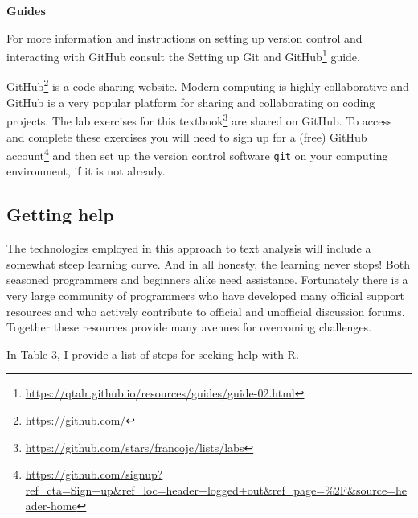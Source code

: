 \documentclass[
  letterpaper,
]{latex/krantz}
\theoremstyle{definition}
\theoremstyle{remark}
\DeclareRobustCommand{\href}[2]{#2\footnote{\url{#1}}}
\begin{document}
\begin{tcolorbox}[enhanced jigsaw, colframe=quarto-callout-color-frame, breakable, bottomrule=.15mm, arc=.35mm, left=2mm, opacityback=0, rightrule=.15mm, colback=white, toprule=.15mm, leftrule=.75mm]

\textbf{ Guides}

For more information and instructions on setting up version control and
interacting with GitHub consult the
\href{https://qtalr.github.io/resources/guides/guide-02.html}{Setting up
Git and GitHub} guide.

\end{tcolorbox}

\href{https://github.com/}{GitHub} is a code sharing website. Modern
computing is highly collaborative and GitHub is a very popular platform
for sharing and collaborating on coding projects. The
\href{https://github.com/stars/francojc/lists/labs}{lab exercises for
this textbook} are shared on GitHub. To access and complete these
exercises you will need to
\href{https://github.com/signup?ref_cta=Sign+up&ref_loc=header+logged+out&ref_page=\%2F&source=header-home}{sign
up for a (free) GitHub account} and then set up the version control
software \texttt{git} on your computing environment, if it is not
already.

\subsection*{Getting help}\label{sec-p-getting-help}

The technologies employed in this approach to text analysis will include
a somewhat steep learning curve. And in all honesty, the learning never
stops! Both seasoned programmers and beginners alike need assistance.
Fortunately there is a very large community of programmers who have
developed many official support resources and who actively contribute to
official and unofficial discussion forums. Together these resources
provide many avenues for overcoming challenges.

In Table 3, I provide a list of steps for seeking help with R.
\end{document}
